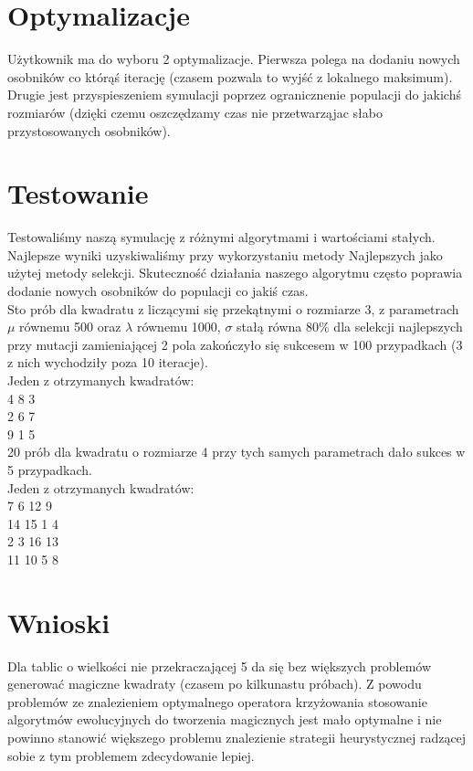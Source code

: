 \documentclass[a4paper,twoside,10pt]{article}
\begin{document}
\section{Optymalizacje}
Użytkownik ma do wyboru 2 optymalizacje. Pierwsza polega na dodaniu nowych osobników co którąś iterację (czasem pozwala to wyjść z lokalnego maksimum). Drugie jest przyspieszeniem symulacji poprzez ogranicznenie populacji do jakichś rozmiarów (dzięki czemu oszczędzamy czas nie przetwarząjac słabo przystosowanych osobników).
\section{Testowanie}
Testowaliśmy naszą symulację z różnymi algorytmami i wartościami stałych. Najlepsze wyniki uzyskiwaliśmy przy wykorzystaniu metody Najlepszych jako użytej metody selekcji. Skuteczność działania naszego algorytmu często poprawia dodanie nowych osobników do populacji co jakiś czas.\\
Sto prób dla kwadratu z liczącymi się przekątnymi o rozmiarze 3, z parametrach $\mu$ równemu 500 oraz $\lambda$ równemu 1000, $\sigma$ stałą równa $80\%$ dla selekcji najlepszych przy mutacji zamieniającej 2 pola zakończyło się sukcesem w 100 przypadkach (3 z nich wychodziły poza 10 iteracje). \\
Jeden z otrzymanych kwadratów: \\
4 8 3 \\
2 6 7 \\
9 1 5 \\
20 prób dla kwadratu o rozmiarze 4 przy tych samych parametrach dało sukces w 5 przypadkach. \\
Jeden z otrzymanych kwadratów: \\
7 6 12 9 \\
14 15 1 4\\
2 3 16 13\\
11 10 5 8 
\section{Wnioski}
Dla tablic o wielkości nie przekraczającej 5 da się bez większych problemów generować magiczne kwadraty (czasem po kilkunastu próbach). Z powodu problemów ze znalezieniem optymalnego operatora krzyżowania stosowanie algorytmów ewolucyjnych do tworzenia magicznych jest mało optymalne i nie powinno stanowić większego problemu znalezienie strategii heurystycznej radzącej sobie z tym problemem zdecydowanie lepiej.
\end{document}
